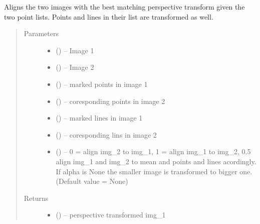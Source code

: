 \documentclass[letterpaper,10pt,english]{sphinxmanual}
\begin{document}
\begin{fulllineitems}
\label{\detokenize{image_perspective_alignment:image_perspective_alignment.perspective_align}}
Aligns the two images with the best matching perspective transform given
the two point lists. Points and lines in their list are transformed as well.
\begin{quote}\begin{description}
\item[{Parameters}] \leavevmode\begin{itemize}
\item {} 
 () -- Image 1

\item {} 
 () -- Image 2

\item {} 
 () -- marked points in image 1

\item {} 
 () -- coresponding points in image 2

\item {} 
 () -- marked lines in image 1

\item {} 
 () -- coresponding lins in image 2

\item {} 
 () -- 0 = align img\_2 to img\_1, 1 = align img\_1 to img\_2, 0.5 align
img\_1 and img\_2 to mean and points and lines acordingly.
If alpha is None the smaller image is transformed to bigger one.
(Default value = None)

\end{itemize}

\item[{Returns}] \leavevmode
\begin{itemize}
\item {} 
 () -- perspective transformed img\_1


\end{itemize}
\end{description}
\end{quote}
\end{fulllineitems}
\end{document}
